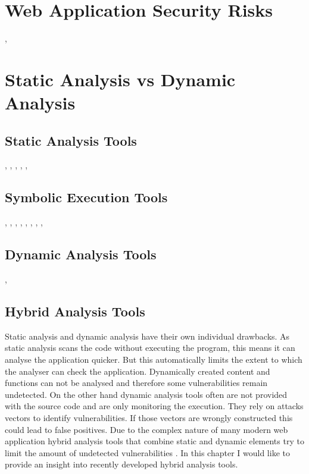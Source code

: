 \section{Web Application Security Risks}
\autocite[]{ElIdrissi2017}, \autocite[]{Li2014}
\section{Static Analysis vs Dynamic Analysis}
\subsection{Static Analysis Tools}
\autocite[]{Chaudhuri2010}, \autocite[]{Near2014}, \autocite[]{Bocic2014}, \autocite[]{Munetoh2013a}, \autocite[]{Jovanovic2006}, \autocite[]{Munetoh2013}
\subsection{Symbolic Execution Tools}
\autocite[]{Chaudhuri2010}, \autocite[]{Near2014}, \autocite[]{Near2012}, \autocite[]{Nijjar2011}, \autocite[]{Near2016}, \autocite[]{Jackson2002}, \autocite[]{Bocic2016}, \autocite[]{Cadar2011}, \autocite[]{Bocic2014}
\subsection{Dynamic Analysis Tools}
\autocite[]{Yip2009}, \autocite[]{Felt2011}

\subsection{Hybrid Analysis Tools}
Static analysis and dynamic analysis have their own individual drawbacks. As static analysis scans the code without executing the program, this means it can analyse the application quicker. But this automatically limits the extent to which the analyser can check the application. Dynamically created content and functions can not be analysed and therefore some vulnerabilities remain undetected. On the other hand dynamic analysis tools often are not provided with the source code and are only monitoring the execution. They rely on attacks vectors to identify vulnerabilities. If those vectors are wrongly constructed this could lead to false positives.
Due to the complex nature of many modern web application hybrid analysis tools that combine static and dynamic elements try to limit the amount of undetected vulnerabilities \autocite[]{Araujo2018, Jahanshahi2018}. In this chapter I would like to provide an insight into recently developed hybrid analysis tools.

